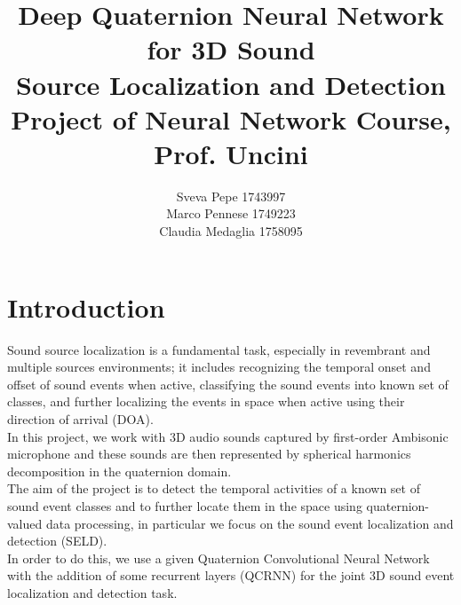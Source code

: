 \documentclass{article}
\title{Deep Quaternion Neural Network for 3D Sound \\ Source Localization and Detection
\\ \large{\vspace{0.4cm}Project of Neural Network Course, Prof. Uncini}}
\author{Sveva Pepe 1743997 \\  Marco Pennese 1749223 \\  Claudia Medaglia 1758095}
\date{}
\begin{document}
    \maketitle
    \section{Introduction}
    Sound source localization is a fundamental task, especially in revembrant and multiple sources environments; it includes recognizing the temporal onset and offset of sound events when active, classifying the sound events into known set of classes, and further localizing the events in space when active using their direction of arrival (DOA).\\
    In this project, we work with 3D audio sounds captured by first-order Ambisonic microphone and these sounds are then represented 
    by spherical harmonics decomposition in the quaternion domain.
    \\ The aim of the project is to detect the temporal activities of a known set of sound event classes and to further locate them in 
    the space using quaternion-valued data processing, in particular we focus on the sound event localization and detection (SELD). 
    \\ In order to do this, we use a given Quaternion Convolutional Neural Network with the addition of some recurrent layers (QCRNN) 
    for the joint 3D sound event localization and detection task.
\end{document}
